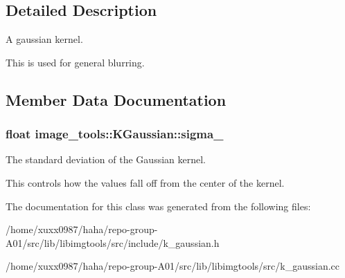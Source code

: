 \subsection{Detailed Description}
A gaussian kernel. 

This is used for general blurring. 

\subsection{Member Data Documentation}
\subsubsection[{\texorpdfstring{sigma\+\_\+}{sigma_}}]{\setlength{\rightskip}{0pt plus 5cm}float image\+\_\+tools\+::\+K\+Gaussian\+::sigma\+\_\+\hspace{0.3cm}{\ttfamily [protected]}}\hypertarget{classimage__tools_1_1KGaussian_aae4a308fd2f1065b363660681c863eed}{}\label{classimage__tools_1_1KGaussian_aae4a308fd2f1065b363660681c863eed}


The standard deviation of the Gaussian kernel. 

This controls how the values fall off from the center of the kernel. 

The documentation for this class was generated from the following files\+:\begin{DoxyCompactItemize}
\item 
/home/xuxx0987/haha/repo-\/group-\/\+A01/src/lib/libimgtools/src/include/k\+\_\+gaussian.\+h\item 
/home/xuxx0987/haha/repo-\/group-\/\+A01/src/lib/libimgtools/src/k\+\_\+gaussian.\+cc\end{DoxyCompactItemize}
